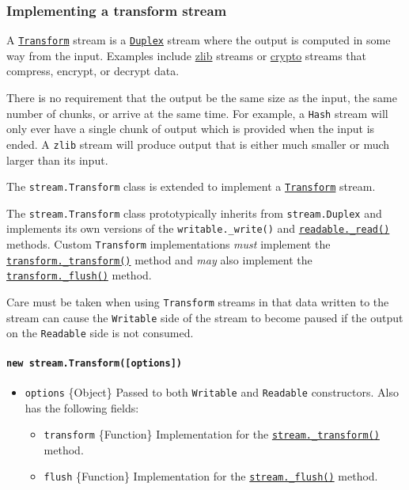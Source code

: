\subsubsection{Implementing a transform
stream}\label{implementing-a-transform-stream}

A \hyperref[class-streamtransform]{\texttt{Transform}} stream is a
\hyperref[class-streamduplex]{\texttt{Duplex}} stream where the output
is computed in some way from the input. Examples include
\href{zlib.md}{zlib} streams or \href{crypto.md}{crypto} streams that
compress, encrypt, or decrypt data.

There is no requirement that the output be the same size as the input,
the same number of chunks, or arrive at the same time. For example, a
\texttt{Hash} stream will only ever have a single chunk of output which
is provided when the input is ended. A \texttt{zlib} stream will produce
output that is either much smaller or much larger than its input.

The \texttt{stream.Transform} class is extended to implement a
\hyperref[class-streamtransform]{\texttt{Transform}} stream.

The \texttt{stream.Transform} class prototypically inherits from
\texttt{stream.Duplex} and implements its own versions of the
\texttt{writable.\_write()} and
\hyperref[readable_readsize]{\texttt{readable.\_read()}} methods. Custom
\texttt{Transform} implementations \emph{must} implement the
\hyperref[transform_transformchunk-encoding-callback]{\texttt{transform.\_transform()}}
method and \emph{may} also implement the
\hyperref[transform_flushcallback]{\texttt{transform.\_flush()}} method.

Care must be taken when using \texttt{Transform} streams in that data
written to the stream can cause the \texttt{Writable} side of the stream
to become paused if the output on the \texttt{Readable} side is not
consumed.

\paragraph{\texorpdfstring{\texttt{new\ stream.Transform({[}options{]})}}{new stream.Transform({[}options{]})}}\label{new-stream.transformoptions}

\begin{itemize}
\tightlist
\item
  \texttt{options} \{Object\} Passed to both \texttt{Writable} and
  \texttt{Readable} constructors. Also has the following fields:

  \begin{itemize}
  \tightlist
  \item
    \texttt{transform} \{Function\} Implementation for the
    \hyperref[transform_transformchunk-encoding-callback]{\texttt{stream.\_transform()}}
    method.
  \item
    \texttt{flush} \{Function\} Implementation for the
    \hyperref[transform_flushcallback]{\texttt{stream.\_flush()}}
    method.
  \end{itemize}
\end{itemize}

